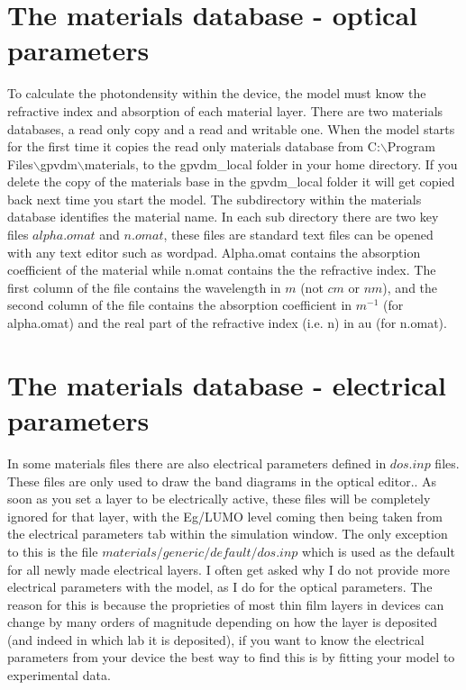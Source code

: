 \documentclass[11pt]{article}
\begin{document}
\section{The materials database - optical parameters}
To calculate the photondensity within the device, the model must know the refractive index and absorption of each material layer.  There are two materials databases, a read only copy and a read and writable one.  When the model starts for the first time it copies the read only materials database from C:$\backslash$Program Files$\backslash$gpvdm$\backslash$materials, to the gpvdm\_local folder in your home directory.  If you delete the copy of the materials base in the gpvdm\_local folder it will get copied back next time you start the model.  The subdirectory within the materials database identifies the material name.  In each sub directory there are two key files $alpha.omat$ and $n.omat$, these files are standard text files can be opened with any text editor such as wordpad.    Alpha.omat contains the absorption coefficient of the material while n.omat contains the the refractive index.  The first column of the file contains the wavelength in $m$ (not $cm$ or $nm$), and the second column of the file contains the absorption coefficient in $m^{-1}$ (for alpha.omat) and the real part of the refractive index (i.e. n) in au (for n.omat).

\section{The materials database - electrical parameters}
In some materials files there are also electrical parameters defined in $dos.inp$ files. These files are only used to draw the band diagrams in the optical editor..  As soon as you set a layer to be electrically active, these files will be completely ignored for that layer, with the Eg/LUMO level coming then being taken from the electrical parameters tab within the simulation window.  The only exception to this is the file $materials/generic/default/dos.inp$ which is used as the default for all newly made electrical layers.  I often get asked why I do not provide more electrical parameters with the model, as I do for the optical parameters.  The reason for this is because the proprieties of most thin film layers in devices can change by many orders of magnitude depending on how the layer is deposited (and indeed in which lab it is deposited), if you want to know the electrical parameters from your device the best way to find this is by fitting your model to experimental data.
\end{document}

